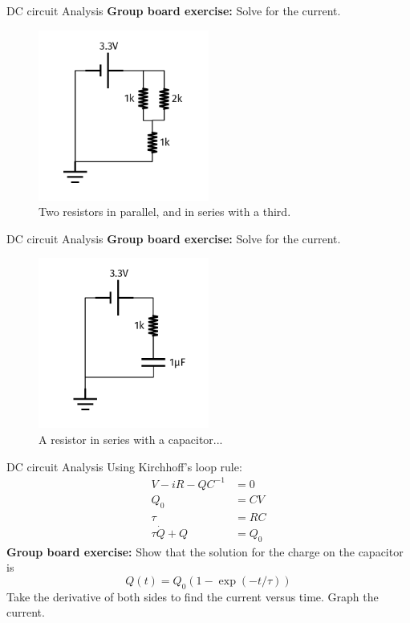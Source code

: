 \documentclass{beamer}
\begin{document}
\begin{frame}{DC circuit Analysis}
\textbf{Group board exercise:} Solve for the current.
\begin{figure}
\centering
\includegraphics[width=0.5\textwidth]{figures/iVCurve6.pdf}
\caption{\label{fig:iVCurve6} Two resistors in parallel, and in series with a third.}
\end{figure}
\end{frame}

\begin{frame}{DC circuit Analysis}
\textbf{Group board exercise:} Solve for the current.
\begin{figure}
\centering
\includegraphics[width=0.5\textwidth]{figures/iVCurve7.pdf}
\caption{\label{fig:iVCurve7} A resistor in series with a capacitor...}
\end{figure}
\end{frame}

\begin{frame}{DC circuit Analysis}
Using Kirchhoff's loop rule:
\begin{align}
V - iR - QC^{-1} &= 0 \\
Q_0 &= CV \\
\tau &= RC \\
\tau \dot{Q} + Q &= Q_0
\end{align}
\textbf{Group board exercise:} Show that the solution for the charge on the capacitor is
\begin{equation}
Q(t) = Q_0 \left(1 - \exp(-t/\tau)\right)
\end{equation}
Take the derivative of both sides to find the current versus time.  Graph the current.
\end{frame}
\end{document}
